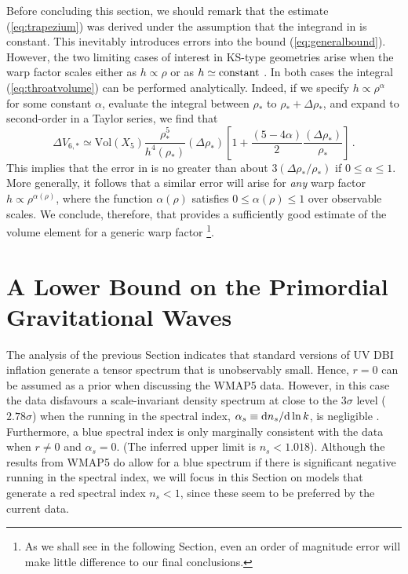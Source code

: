 Before concluding this section, we should remark that 
the estimate (\ref{eq:trapezium}) was derived under the assumption  
that the integrand in   
is constant. This inevitably introduces errors into the bound
(\ref{eq:generalbound}). However, the two limiting cases of interest 
in KS-type geometries arise 
when the warp factor scales either as $h \propto \rho$
or as $h \simeq {\rm constant}$ \cite{ks,kt}. In both cases
the integral (\ref{eq:throatvolume}) can be performed analytically. 
Indeed, if we specify $h \propto \rho^{\alpha}$ for some constant $\alpha$,  
evaluate the integral between $\rho_{*}$ 
to $\rho_{*}+\Delta \rho_{*}$, and expand to second-order in a 
Taylor series, we find that  
% 
\begin{equation}
\label{eq:limits}
\Delta V_{6,*} \simeq \mathrm{Vol}(X_5) \frac{\rho^5_{*}}{h^{4} 
(\rho_{*} )}(\Delta \rho_*) 
\left[ 1 +\frac{(5-4 \alpha )}{2} 
\frac{(\Delta \rho_*)}{\rho_{*}} \right]  \,.
\end{equation}
% 
This implies that the error in  
is no greater than 
about $3 (\Delta \rho_* / \rho_*)$ if  
$0 \le \alpha \le 1$. More generally, it follows that a similar
error will arise for {\em any} warp factor 
$h \propto \rho^{\alpha (\rho )}$, where the function 
$\alpha (\rho)$ satisfies $0 \le \alpha (\rho ) \le 1$ 
over observable scales. 
We conclude, therefore, that  
provides a sufficiently good estimate of the volume element  
for a generic warp factor
\footnote{As we shall see in the following Section, 
even an order of magnitude error will make little 
difference to our final conclusions.}.  
% 
% 
% 
% 
\section{A Lower Bound on the Primordial Gravitational Waves} 
% 
\label{sec:lower-dbi}

The analysis of the previous Section 
indicates that standard versions of UV DBI inflation generate a 
tensor spectrum that is unobservably 
small. Hence, $r=0$ can be assumed as a prior when discussing the WMAP5 data.
However, in this case the data 
disfavours a scale-invariant density spectrum at close to the $3 \sigma$ level
($2.78\sigma$)
when the running in the spectral index, $\alpha_s \equiv \mathrm{d} n_s/\mathrm{d}\ln k$, 
is negligible \cite{Komatsu:2008hk}.  
Furthermore, a blue spectral index 
is only marginally consistent with the data when $r\ne 0$ and $\alpha_s=0$. 
(The inferred upper limit is $n_s < 1.018$).
Although the results from WMAP5 do allow for a blue spectrum if there is 
significant negative running in the spectral index, we will 
focus in this Section 
on models that generate a red spectral index $n_s<1$, since these seem 
to be preferred by the current data.   


